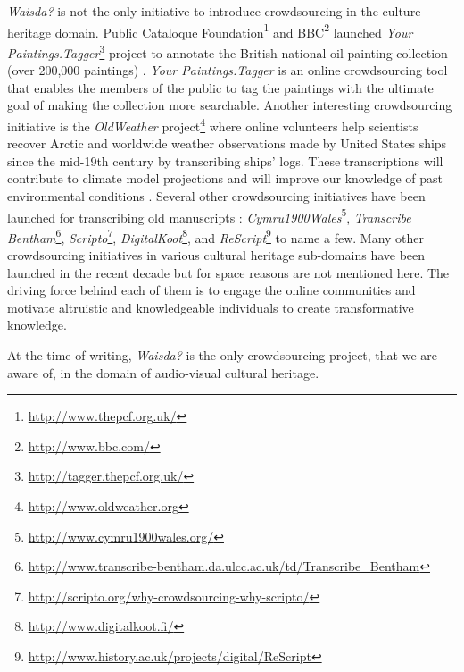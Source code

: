 \textit{Waisda?} is not the only initiative to introduce crowdsourcing in the culture heritage domain. Public Cataloque Foundation\footnote{\url{http://www.thepcf.org.uk/}} and BBC\footnote{\url{http://www.bbc.com/}} launched \textit{Your Paintings.Tagger}\footnote{\url{http://tagger.thepcf.org.uk/}} project to annotate the British national oil painting collection (over 200,000 paintings) \cite{ellis2012your}. \textit{Your Paintings.Tagger} is an online crowdsourcing tool that enables the members of the public to tag the paintings with the ultimate goal of making the collection more searchable. Another interesting crowdsourcing initiative is the \textit{OldWeather} project\footnote{\url{http://www.oldweather.org}} where online volunteers help scientists recover Arctic and worldwide weather observations made by United States ships since the mid-19th century by transcribing ships' logs. These transcriptions will contribute to climate model projections and will improve our knowledge of past environmental conditions \cite{brohan2009marine}. Several other crowdsourcing initiatives have been launched for transcribing old manuscripts \cite{causer2014many,leon2014build,chrons2011digitalkoot}: \textit{Cymru1900Wales}\footnote{\url{http://www.cymru1900wales.org/}},  \textit{Transcribe Bentham}\footnote{\url{http://www.transcribe-bentham.da.ulcc.ac.uk/td/Transcribe_Bentham}}, \textit{Scripto}\footnote{\url{http://scripto.org/why-crowdsourcing-why-scripto/}}, \textit{DigitalKoot}\footnote{\url{http://www.digitalkoot.fi/}}, and \textit{ReScript}\footnote{\url{http://www.history.ac.uk/projects/digital/ReScript}} to name a few. Many other crowdsourcing initiatives in various cultural heritage sub-domains have been launched in the recent decade but for space reasons are not mentioned here. The driving force behind each of them is to engage the online communities and motivate altruistic and knowledgeable individuals to create transformative knowledge.

At the time of writing, \textit{Waisda?} is the only crowdsourcing project, that we are aware of, in the domain of audio-visual cultural heritage.



